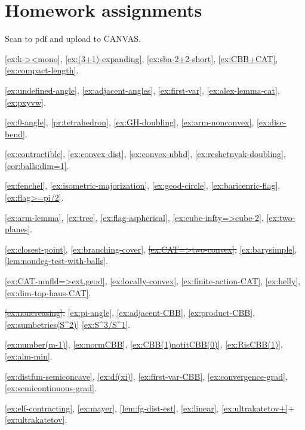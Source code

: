 \chapter*{Homework assignments}

Scan to pdf and upload to CANVAS.

\ref{ex:k-><mono},
\ref{ex:(3+1)-expanding},
\ref{ex:sba-2+2-short},
\ref{ex:CBB+CAT},
\ref{ex:compact-length}.

\ref{ex:undefined-angle},
\ref{ex:adjacent-angles},
\ref{ex:first-var},
\ref{ex:alex-lemma-cat},
\ref{ex:pxyvw}.

\ref{ex:0-angle},
\ref{pr:tetrahedron},
\ref{ex:GH-doubling},
\ref{ex:arm-nonconvex},
\ref{ex:disc-bend}.

\ref{ex:contractible},
\ref{ex:convex-dist},
\ref{ex:convex-nbhd},
\ref{ex:reshetnyak-doubling},
\ref{cor:balls:dim=1}.

\ref{ex:fenchel},
\ref{ex:isometric-majorization},
\ref{ex:geod-circle},
\ref{ex:baricenric-flag},
\ref{ex:flag>=pi/2}.

\ref{ex:arm-lemma},
\ref{ex:tree},
\ref{ex:flag-aspherical},
\ref{ex:cube-infty=>cube-2},
\ref{ex:two-planes}.

\ref{ex:closest-point},
\ref{ex:branching-cover},
\sout{\ref{ex:CAT=>two-convex},}
\ref{ex:barysimple},
\ref{lem:nondeg-test-with-balls}.

\ref{ex:CAT-mnfld=>ext.geod},
\ref{ex:locally-convex},
\ref{ex:finite-action-CAT},
\ref{ex:helly},
\ref{ex:dim-top-haus-CAT}.

\sout{\ref{ex:noncreasing},}
\ref{ex:pi-angle},
\ref{ex:adjacent-CBB},
\ref{ex:product-CBB},
\ref{ex:sumbetries(S^2)}
\ref{ex:S^3/S^1}.

\ref{ex:number(m-1)},
\ref{ex:normCBB},
\ref{ex:CBB(1)notitCBB(0)},
\ref{ex:RisCBB(1)},
\ref{ex:alm-min}.

\ref{ex:distfun-semiconcave},
\ref{ex:df(xi)},
\ref{ex:first-var-CBB},
\ref{ex:convergence-grad},
\ref{ex:semicontinuous-grad}.

\ref{ex:elf-contracting},
\ref{ex:mayer},
\ref{lem:fg-dist-est},
\ref{ex:linear},
\ref{ex:ultrakatetov+}+\ref{ex:ultrakatetov}.
\newpage

